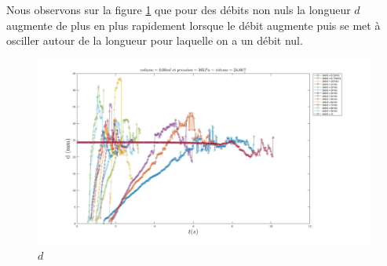 \documentclass[french]{article}
\begin{document}
Nous observons sur la figure \ref{fig:p=365_vol=006d} que pour des débits non nuls la longueur $d$ augmente de plus en plus rapidement lorsque le débit augmente puis se met à osciller autour de la longueur pour laquelle on a un débit nul.

\begin{figure}[!h]
	\centering
	\includegraphics[width = \linewidth]{./image/p=365_vol=006d.jpg}
	\caption{$d$}
\label{fig:p=365_vol=006d}
\end{figure}
\end{document}
